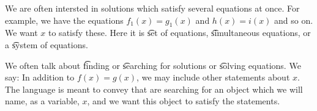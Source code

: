 We are often intersted in solutions which satisfy several equations at once.
For example, we have the equations $f_1(x) = g_1(x)$ and $h(x) = i(x)$ and so on.
We want $x$ to satisfy these.
Here it is \t{set of equations}, \t{simultaneous equations}, or a \t{system of equations}.


We often talk about \t{finding} or \t{searching} for solutions or \t{solving equations}.
We say: 
In addition to $f(x) = g(x)$, we may include other statements about $x$.
The language is meant to convey that are searching for an object which we will name, as a variable, $x$, and we want this object to satisfy the statements.
